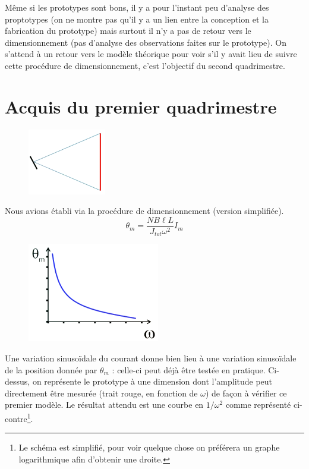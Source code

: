

Même si les prototypes sont bons, il y a pour l'instant peu d'analyse des proptotypes (on ne montre pas qu'il y a
un lien entre la conception et la fabrication du prototype) mais surtout il n'y a pas de retour vers le 
dimensionnement (pas d'analyse des observations faites sur le prototype). On s'attend à un retour vers le modèle
théorique pour voir s'il y avait lieu de suivre cette procédure de dimensionnement, c'est l'objectif du second 
quadrimestre.

\section*{Acquis du premier quadrimestre}
\begin{figure}
\vspace{-12mm}
\includegraphics[scale=0.45]{ch1/image1.png}
\end{figure}
Nous avions établi via la procédure de dimensionnement (version simplifiée).
\begin{equation}
\theta_m = \dfrac{NB\ell L}{J_{tot}\omega^2}I_m
\end{equation}

\begin{figure}
\vspace{-10mm}
\includegraphics[scale=0.45]{ch1/image2.png}
\end{figure}
Une variation sinusoïdale du courant donne bien lieu à une variation sinusoïdale de la position donnée par
$\theta_m$ : celle-ci peut déjà être testée en pratique. Ci-dessus, on représente le prototype à une 
dimension dont l'amplitude peut directement être mesurée (trait rouge, en fonction de $\omega$) de façon à 
vérifier ce premier modèle. Le résultat attendu est une courbe en $1/\omega^2$ comme représenté 
ci-contre\footnote{Le schéma est simplifié, pour voir quelque chose on préférera un graphe logarithmique afin
d'obtenir une droite.}.\\

